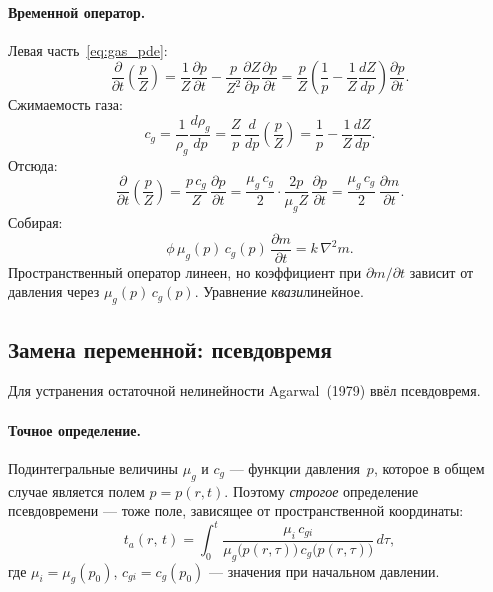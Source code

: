 ﻿\documentclass[12pt,a4paper]{article}
\begin{document}
\paragraph{Временной оператор.}
Левая часть~\eqref{eq:gas_pde}:
\begin{equation}\label{eq:lhs_gas}
  \frac{\partial}{\partial t}\left(\frac{p}{Z}\right)
  = \frac{1}{Z}\frac{\partial p}{\partial t}
  - \frac{p}{Z^2}\frac{\partial Z}{\partial p}\frac{\partial p}{\partial t}
  = \frac{p}{Z}\left(\frac{1}{p} - \frac{1}{Z}\frac{dZ}{dp}\right)
    \frac{\partial p}{\partial t}.
\end{equation}
Сжимаемость газа:
\begin{equation}\label{eq:cg}
  c_g = \frac{1}{\rho_g}\frac{d\rho_g}{dp}
  = \frac{Z}{p}\,\frac{d}{dp}\!\left(\frac{p}{Z}\right)
  = \frac{1}{p} - \frac{1}{Z}\frac{dZ}{dp}.
\end{equation}
Отсюда:
\begin{equation}\label{eq:lhs_gas2}
  \frac{\partial}{\partial t}\left(\frac{p}{Z}\right)
  = \frac{p\,c_g}{Z}\,\frac{\partial p}{\partial t}
  = \frac{\mu_g\,c_g}{2}\cdot
    \frac{2p}{\mu_g Z}\,\frac{\partial p}{\partial t}
  = \frac{\mu_g\,c_g}{2}\,\frac{\partial m}{\partial t}.
\end{equation}
Собирая:
\begin{equation}\label{eq:gas_quasi}
  \boxed{\phi\,\mu_g(p)\,c_g(p)\,\frac{\partial m}{\partial t}
  = k\,\nabla^2 m.}
\end{equation}
Пространственный оператор линеен, но коэффициент при $\partial m/\partial t$
зависит от давления через $\mu_g(p)\,c_g(p)$. Уравнение
\emph{квази}линейное.

\subsection{Замена переменной: псевдовремя}\label{ssec:pseudo_t}

Для устранения остаточной нелинейности Agarwal~(1979) ввёл псевдовремя.

\paragraph{Точное определение.}
Подинтегральные величины $\mu_g$ и $c_g$ --- функции давления~$p$,
которое в общем случае является полем $p = p(r, t)$. Поэтому
\emph{строгое} определение псевдовремени --- тоже поле,
зависящее от пространственной координаты:
\begin{equation}\label{eq:ta_exact}
  t_a(r,\,t) = \int_0^t
    \frac{\mu_i\,c_{gi}}{\mu_g\bigl(p(r,\tau)\bigr)\,
          c_g\bigl(p(r,\tau)\bigr)}\,d\tau,
\end{equation}
где $\mu_i = \mu_g(p_0)$, $c_{gi} = c_g(p_0)$ --- значения при
начальном давлении.
\end{document}
